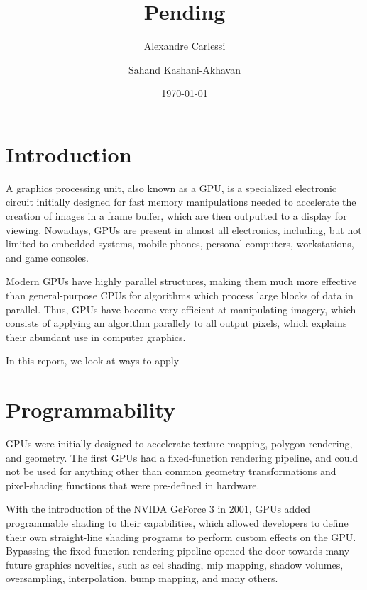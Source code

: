 \documentclass[10pt, a4paper]{report}
\begin{document}
\title{Pending}
\author{Alexandre Carlessi \and Sahand Kashani-Akhavan}
\date{\today}
\maketitle

\section*{Introduction}
A graphics processing unit, also known as a GPU, is a specialized electronic
circuit initially designed for fast memory manipulations needed to accelerate
the creation of images in a frame buffer, which are then outputted to a display
for viewing.
Nowadays, GPUs are present in almost all electronics, including, but not limited
to embedded systems, mobile phones, personal computers, workstations, and game
consoles.

Modern GPUs have highly parallel structures, making them much more effective
than general-purpose CPUs for algorithms which process large blocks of data in
parallel.
Thus, GPUs have become very efficient at manipulating imagery, which consists
of applying an algorithm parallely to all output pixels, which explains their
abundant use in computer graphics.

In this report, we look at ways to apply

\section*{Programmability}
GPUs were initially designed to accelerate texture mapping, polygon rendering,
and geometry.
The first GPUs had a fixed-function rendering pipeline, and could not be used
for anything other than common geometry transformations and pixel-shading
functions that were pre-defined in hardware.

With the introduction of the NVIDA GeForce 3 in 2001, GPUs added programmable
shading to their capabilities, which allowed developers to define their own
straight-line shading programs to perform custom effects on the GPU.
Bypassing the fixed-function rendering pipeline opened the door towards many
future graphics novelties, such as cel shading, mip mapping, shadow volumes,
oversampling, interpolation, bump mapping, and many others.
\end{document}
